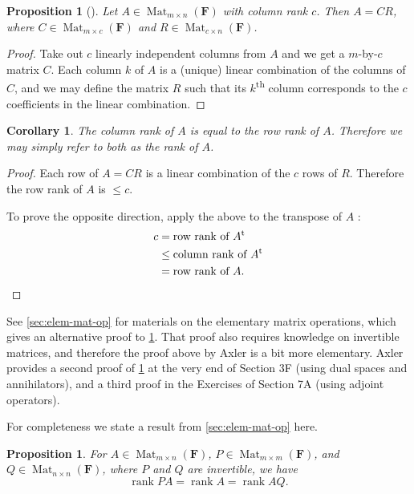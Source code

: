 \documentclass[10pt]{article}
\numberwithin{equation}{section}
\theoremstyle{plain-star}
\newtheorem{prop}[equation]{Proposition}
\newtheorem{cor}[equation]{Corollary}
\theoremstyle{definition-star}
\theoremstyle{remark-star}
\theoremstyle{plain-star}
\newcommand{\F}{\mathbf{F}}
\newcommand{\Mat}{\operatorname{Mat}}
\newcommand{\rank}{\operatorname{rank}}
\newcommand{\trp}{\mathrm{t}}
\newcommand{\df}[1]{\textit{#1}}
\begin{document}
\begin{prop}[{\cite[3.56]{axler2024}}]
    Let $A \in \Mat_{m\times n}(\F)$ with column rank $c$. Then $A = CR$, where $C\in \Mat_{m\times c}(\F)$ and $R\in \Mat_{c\times n}(\F)$.
\end{prop}
\begin{proof}
    Take out $c$ linearly independent columns from $A$ and we get a $m$-by-$c$ matrix $C$. Each column $k$ of $A$ is a (unique) linear combination of the columns of $C$, and we may define the matrix $R$ such that its $k$\textsuperscript{th} column corresponds to the $c$ coefficients in the linear combination.
\end{proof}
\begin{cor}\label{cor:rank-result}
    The column rank of $A$ is equal to the row rank of $A$. Therefore we may simply refer to both as the \df{rank} of $A$.
\end{cor}
\begin{proof}
    Each row of $A = CR$ is a linear combination of the $c$ rows of $R$. Therefore the row rank of $A$ is $\leq c$.

    To prove the opposite direction, apply the above to the transpose of $A$ :
    \begin{align*}
        c & = \text{row rank of } A^\trp \\
        & \leq \text{column rank of } A^\trp \\
        & = \text{row rank of } A. \qedhere
    \end{align*}
\end{proof}

See \cref{sec:elem-mat-op} for materials on the elementary matrix operations, which gives an alternative proof to \cref{cor:rank-result}. That proof also requires knowledge on invertible matrices, and therefore the proof above by Axler is a bit more elementary. Axler provides a second proof of \cref{cor:rank-result} at the very end of Section 3F (using dual spaces and annihilators), and a third proof in the Exercises of Section 7A (using adjoint operators).

For completeness we state a result from \cref{sec:elem-mat-op} here.

\begin{prop}
    For $A \in \Mat_{m\times n}(\F)$, $P \in \Mat_{m \times m}(\F)$, and $Q \in \Mat_{n \times n}(\F)$, where $P$ and $Q$ are invertible, we have \[
        \rank PA = \rank A = \rank AQ.
    \]
\end{prop}
\end{document}
